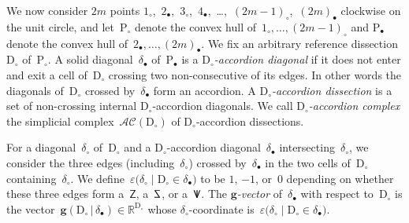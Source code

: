 \documentclass{amsart}
\theoremstyle{definition}
\newcommand{\R}{\mathbb{R}} %
\renewcommand{\b}[1]{\mathbf{#1}} %
\newcommand{\bigset}[2]{\big\{ #1 \;\big|\; #2 \big\}} %
\newcommand{\eqdef}{\mbox{\,\raisebox{0.2ex}{\scriptsize\ensuremath{\mathrm:}}\ensuremath{=}\,}} %
\newcommand{\darkblue}{\color{darkblue}} %
\newcommand{\defn}[1]{\textsl{\darkblue #1}} %
\newcommand{\accordionComplex}{\mathcal{AC}} %
\newcommand{\polygon}{\mathrm{P}} %
\newcommand{\dissection}{\mathrm{D}} %
\newcommand{\sign}[3]{\varepsilon \big( {#1}\;|\;{#2} \in {#3} \big)} %
\newcommand{\SSS}{\reflectbox{$\mathsf{Z}$}} %
\newcommand{\ZZZ}{\mathsf{Z}} %
\newcommand{\VVV}{{\mathsf{{V \hspace{-.1686cm} I\,}}}} %
\newcommand{\gvector}[2]{\mathbf{g}(#1 \,|\, #2)} %
\newcommand{\biggvectors}[2]{\mathbf{g} \big( #1 \,|\, #2 \big)} %
\newcommand{\gvectorFan}{\mathcal{F}^\mathbf{g}} %
\begin{document}
We now consider $2m$ points \mbox{$1_\circ$, $2_\bullet$, $3_\circ$, $4_\bullet$, \dots, $(2m-1)_\circ$, $(2m)_\bullet$} clockwise on the unit circle, and let~$\polygon_\circ$ denote the convex hull of~$1_\circ, \dots, (2m-1)_\circ$ and $\polygon_\bullet$ denote the convex hull of~$2_\bullet, \dots, (2m)_\bullet$.
We fix an arbitrary reference dissection~$\dissection_\circ$ of~$\polygon_\circ$.
A solid diagonal~$\delta_\bullet$ of~$\polygon_\bullet$ is a \defn{$\dissection_\circ$-accordion diagonal} if it does not enter and exit a cell of~$\dissection_\circ$ crossing two non-consecutive of its edges.
In other words the diagonals of~$\dissection_\circ$ crossed by~$\delta_\bullet$ form an accordion.
A \defn{$\dissection_\circ$-accordion dissection} is a set of non-crossing internal $\dissection_\circ$-accordion diagonals. We call \defn{$\dissection_\circ$-accordion complex} the simplicial complex~$\accordionComplex(\dissection_\circ)$ of $\dissection_\circ$-accordion dissections.



For a diagonal~$\delta_\circ$ of~$\dissection_\circ$ and a $\dissection_\circ$-accordion diagonal~$\delta_\bullet$ intersecting~$\delta_\circ$, we consider the three edges (including~$\delta_\circ$) crossed by~$\delta_\bullet$ in the two cells of~$\dissection_\circ$ containing~$\delta_\circ$. We define~$\sign{\delta_\circ}{\dissection_\circ}{\delta_\bullet}$ to be $1$, $-1$, or~$0$ depending on whether these three edges form a~$\ZZZ$, a~$\SSS$, or a~$\VVV$.
The \defn{$\b{g}$-vector} of~$\delta_\bullet$ with respect to~$\dissection_\circ$ is the vector~$\gvector{\dissection_\circ}{\delta_\bullet} \in \R^{\dissection_\circ}$ whose $\delta_\circ$-coordinate is~$\sign{\delta_\circ}{\dissection_\circ}{\delta_\bullet}$.
\end{document}
